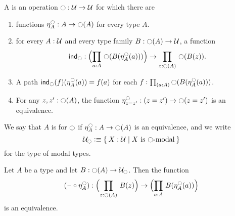 \documentclass[hott-all.tex]{subfiles}
\begin{document}
\begin{defn}
A 
is an operation $\ocircle:\mathcal{U}\to\mathcal{U}$ for which there are
\begin{enumerate}
\item functions $\eta^{\ocircle}_A:A\to\ocircle(A)$ for every type $A$.
\item for every $A:\mathcal{U}$ and every type family $B:\ocircle(A)\to\mathcal{U}$, a function
\begin{equation*}
\ind{\modal}:\Parens{\prd{a:A}\modal(B(\mreturn^\modal_A(a)))}\to\prd{z:\modal(A)}\modal(B(z)).
\end{equation*}
\item A path $\mathsf{ind}_{\ocircle}(f)(\eta^{\ocircle}_A(a)) = f(a)$ for each $f:\prd{a:A}\modal(B(\mreturn^\modal_A(a)))$.
\item For any $z,z':\ocircle(A)$, the function $\eta^{\ocircle}_{z=z'} : (z=z') \to \ocircle(z=z')$ is an equivalence.
\end{enumerate}
We say that $A$ is 
%
%
for $\ocircle$ if $\eta^{\ocircle}_A:A\to\ocircle(A)$ is an equivalence, and we write
\begin{equation}
  \modaltype\defeq\setof{X:\type | X \text{ is $\modal$-modal} }\fakelabel{eq:modaltype}
\end{equation}
for the type of modal types.
\end{defn}
% 
% 
% 
\begin{thm}
Let $A$ be a type and let $B:\ocircle(A)\to\mathcal{U}_{\ocircle}$. Then the function
\begin{equation*}
(\blank\circ \mreturn^\modal_A) : \Parens{\prd{z:\modal(A)}B(z)} \to \Parens{\prd{a:A}B(\mreturn^\modal_A(a))}
\end{equation*}
is an equivalence.
\end{thm}
\end{document}
